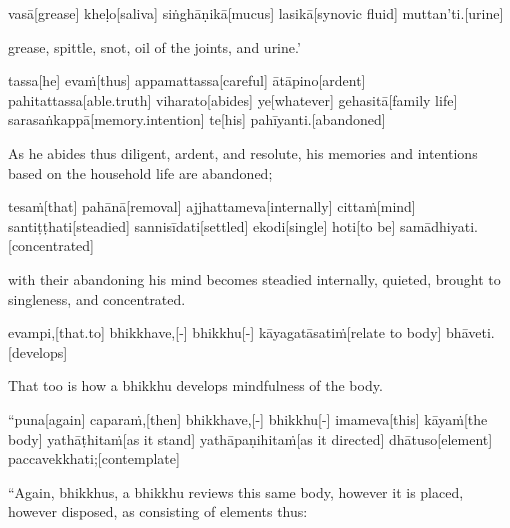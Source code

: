 \begin{samepage}
\begingl[glneveryline={\PaliGlossA,\PaliGlossB}]
vasā[grease] kheḷo[saliva] siṅghāṇikā[mucus] lasikā[synovic fluid] muttan’ti.[urine]
\endgl
\nopagebreak
\linespread{0.5}
\begin{spacin}{0.2}
{\PaliGlossFT grease, spittle, snot, oil of the joints, and urine.’}
\end{spacin}
\vskip 12pt
\end{samepage}
\begin{samepage}
\begingl[glneveryline={\PaliGlossA,\PaliGlossB}]
tassa[he] evaṁ[thus] appamattassa[careful] ātāpino[ardent] pahitattassa[able.truth] viharato[abides] ye[whatever] gehasitā[family life] sarasaṅkappā[memory.intention] te[his] pahīyanti.[abandoned]
\endgl
\nopagebreak
\linespread{0.5}
\begin{spacin}{0.2}
{\PaliGlossFT As he abides thus diligent, ardent, and resolute, his memories and intentions based on the household life are abandoned;}
\end{spacin}
\vskip 12pt
\end{samepage}
\begin{samepage}
\begingl[glneveryline={\PaliGlossA,\PaliGlossB}]
tesaṁ[that] pahānā[removal] ajjhattameva[internally] cittaṁ[mind] santiṭṭhati[steadied] sannisīdati[settled] ekodi[single] hoti[to be] samādhiyati.[concentrated]
\endgl
\nopagebreak
\linespread{0.5}
\begin{spacin}{0.2}
{\PaliGlossFT with their abandoning his mind becomes steadied internally, quieted, brought to singleness, and concentrated.}
\end{spacin}
\vskip 12pt
\end{samepage}
\begin{samepage}
\begingl[glneveryline={\PaliGlossA,\PaliGlossB}]
evampi,[that.to] bhikkhave,[-] bhikkhu[-] kāyagatāsatiṁ[relate to body] bhāveti.[develops]
\endgl
\nopagebreak
\linespread{0.5}
\begin{spacin}{0.2}
{\PaliGlossFT That too is how a bhikkhu develops mindfulness of the body.}
\end{spacin}
\vskip 12pt
\end{samepage}
\vskip 0.2in
\begin{samepage}
\begingl[glneveryline={\PaliGlossA,\PaliGlossB}]
“puna[again] caparaṁ,[then] bhikkhave,[-] bhikkhu[-] imameva[this] kāyaṁ[the body] yathāṭhitaṁ[as it stand] yathāpaṇihitaṁ[as it directed] dhātuso[element] paccavekkhati;[contemplate]
\endgl
\nopagebreak
\linespread{0.5}
\begin{spacin}{0.2}
{\PaliGlossFT “Again, bhikkhus, a bhikkhu reviews this same body, however it is placed, however disposed, as consisting of elements thus:}
\end{spacin}
\vskip 12pt
\end{samepage}

